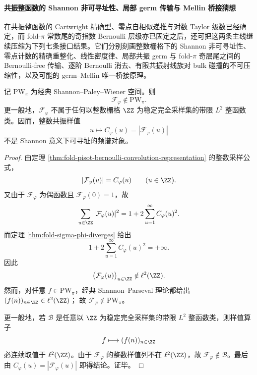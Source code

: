 \paragraph{共振整函数的 Shannon 非可寻址性、局部 germ 传输与 Mellin 桥接猜想}
在共振整函数的 Cartwright 精确型、零点自相似递推与对数 Taylor 级数已经确定，而 fold-\(\pi\) 常数尾的奇指数 Bernoulli 层级亦已固定之后，还可把这两条主线继续压缩为下列七条接口结果。它们分别刻画整数栅格下的 Shannon 非可寻址性、零点计数的精确重整化、线性密度律、局部共振 germ 与 fold-\(\pi\) 奇层尾之间的 Bernoulli-free 传输、逐阶 Bernoulli 消去、有限共振射线族对 bulk 碰撞的不可压缩性，以及可能的 germ--Mellin 唯一桥接原理。

\begin{theorem}\label{thm:xi-time-part9v-resonance-shannon-paley-wiener-obstruction}
记 \(\mathrm{PW}_\pi\) 为经典 Shannon--Paley--Wiener 空间。则
\[
\mathcal F_\varphi\notin \mathrm{PW}_\pi.
\]
更一般地，\(\mathcal F_\varphi\) 不属于任何以整数栅格 \(\ZZ\) 为稳定完全采样集的带限 \(L^2\) 整函数类。因而，整数共振样值
\[
u\longmapsto C_\varphi(u)=|\mathcal F_\varphi(u)|
\]
不是 Shannon 意义下可寻址的频谱对象。
\end{theorem}
\begin{proof}
由定理 \ref{thm:fold-pisot-bernoulli-convolution-representation} 的整数采样公式，
\[
|\mathcal F_\varphi(u)|=C_\varphi(u)
\qquad (u\in\ZZ).
\]
又由于 \(\mathcal F_\varphi\) 为偶函数且 \(\mathcal F_\varphi(0)=1\)，故
\[
\sum_{u\in\ZZ}|\mathcal F_\varphi(u)|^2
=
1+2\sum_{u=1}^{\infty}C_\varphi(u)^2.
\]
而定理 \ref{thm:fold-sigma-phi-diverges} 给出
\[
1+2\sum_{u=1}^{\infty}C_\varphi(u)^2=+\infty.
\]
因此
\[
\bigl(\mathcal F_\varphi(u)\bigr)_{u\in\ZZ}\notin \ell^2(\ZZ).
\]
然而，对任意 \(f\in \mathrm{PW}_\pi\)，经典 Shannon--Parseval 理论都给出
\(
(f(n))_{n\in\ZZ}\in \ell^2(\ZZ)
\)；
故 \(\mathcal F_\varphi\notin \mathrm{PW}_\pi\)。

更一般地，若 \(\mathcal B\) 是任意以 \(\ZZ\) 为稳定完全采样集的带限 \(L^2\) 整函数类，则样值算子
\[
f\longmapsto (f(n))_{n\in\ZZ}
\]
必连续取值于 \(\ell^2(\ZZ)\)。由于 \(\mathcal F_\varphi\) 的整数样值列不在 \(\ell^2(\ZZ)\)，故 \(\mathcal F_\varphi\notin \mathcal B\)。最后由 \(C_\varphi(u)=|\mathcal F_\varphi(u)|\) 即得结论。证毕。
\end{proof}

